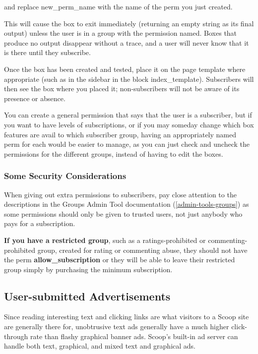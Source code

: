 and replace new\_perm\_name with the name of the perm you just created.

This will cause the box to exit immediately (returning an empty string as its final output) unless the user is in a group with the permission named.  Boxes that produce no output disappear without a trace, and a user will never know that it is there until they subscribe.

Once the box has been created and tested, place it on the page template where appropriate (such as in the sidebar in the block index\_template).  Subscribers will then see the box where you placed it; non-subscribers will not be aware of its presence or absence.

You can create a general permission that says that the user is a subscriber, but if you want to have levels of subscriptions, or if you may someday change which box features are avail to which subscriber group, having an appropriately named perm for each would be easier to manage, as you can just check and uncheck the permissions for the different groups, instead of having to edit the boxes.

\subsubsection{Some Security Considerations}
\label{subscription-security}

When giving out extra permissions to subscribers, pay close attention to the descriptions in the Groups Admin Tool documentation (\ref{admin-tools-groups}) as some permissions should only be given to trusted users, not just anybody who pays for a subscription.

{\bf If you have a restricted group}, such as a ratings-prohibited or commenting-prohibited group, created for rating or commenting abuse, they should not have the perm {\bf allow\_subscription} or they will be able to leave their restricted group simply by purchasing the minimum subscription.

\subsection{User-submitted Advertisements}
\label{features-textads}

Since reading interesting text and clicking links are what visitors to a Scoop site are generally there for, unobtrusive text ads generally have a much higher click-through rate than flashy graphical banner ads. Scoop's built-in ad server can handle both text, graphical, and mixed text and graphical ads.

